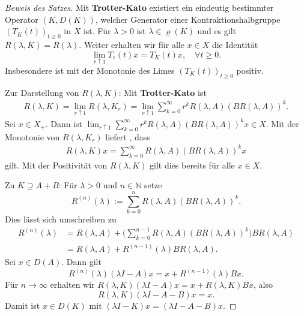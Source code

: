 \begin{proof}[Beweis des Satzes]
\par
Mit \textbf{Trotter-Kato} existiert ein eindeutig bestimmter Operator $(K, D(K))$, welcher Generator einer Kontraktionshalbgruppe $(T_K(t))_{t\geq0}$ in $X$ ist. Für $\lambda>0$ ist $\lambda\in\varrho(K)$ und es gilt $R(\lambda, K)=R(\lambda)$. Weiter erhalten wir für alle $x\in X$ die Identität
\begin{equation*}
\lim_{r\uparrow 1} T_r(t)x = T_K(t)x,\quad\forall t\geq0.
\end{equation*}
Insbesondere ist mit der Monotonie des Limes $(T_K(t))_{t\geq0}$ positiv.

\par
Zur Darstellung von $R(\lambda, K)$: Mit \textbf{Trotter-Kato} ist
\begin{align*}
R(\lambda, K)=\lim_{r\uparrow1}R(\lambda, K_r)=\lim_{r\uparrow 1}\sum_{k=0}^\infty r^k R(\lambda, A)(BR(\lambda, A))^k.
\end{align*}
Sei $x\in X_+$. Dann ist $\lim_{r\uparrow 1}\sum_{k=0}^\infty r^k R(\lambda, A)(BR(\lambda, A))^k x\in X$. Mit der Monotonie von $R(\lambda, K_r)$ liefert \Cref{}, dass  
\begin{align*}
R(\lambda, K)x=\sum_{k=0}^\infty R(\lambda, A)(BR(\lambda, A))^kx
\end{align*}
gilt. Mit der Positivität von $R(\lambda, K)$ gilt dies bereits für alle $x\in X$.

\par
Zu $K\supseteq A+B$: Für $\lambda>0$ und  $n\in \mathbb N$ setze
\begin{equation*}
R^{(n)}(\lambda) := \sum_{k=0}^n R(\lambda, A)(BR(\lambda, A))^k.
\end{equation*}
Dies lässt sich umschreiben zu
\begin{align*}
R^{(n)}(\lambda) 
&= R(\lambda, A) + \Bigg(\sum_{k=0}^{n-1}R(\lambda, A) (BR(\lambda, A))^k\Bigg) BR(\lambda,  A)\\
&= R(\lambda, A) + R^{(n-1)}(\lambda) B R(\lambda, A).
\end{align*}
Sei $x\in D(A)$. Dann gilt
\begin{equation*}
R^{(n)}(\lambda)(\lambda I -A)x = x + R^{(n-1)}(\lambda)Bx.
\end{equation*}
Für $n\to \infty$ erhalten wir $R(\lambda, K)(\lambda I- A)x=x+R(\lambda, K)Bx$, also
\begin{equation*}
R(\lambda, K)(\lambda I -A-B)x=x.
\end{equation*}
Damit ist $x\in D(K)$ mit $(\lambda I -K)x = (\lambda I -A-B)x$.
\end{proof}

